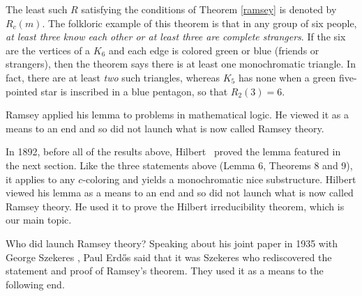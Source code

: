 \documentclass{article}
\theoremstyle{plain}
\theoremstyle{definition}
\newcommand{\Erdos}{Erd{\H{o}}s }
\begin{document}
The least such $R$ satisfying the conditions of Theorem \ref{ramsey} is denoted by $R_c(m)$.  The folkloric example of this theorem is 
that in any group of six people, \emph{at least three know each other or at least three are complete strangers}.  If the six are the vertices of a $K_6$ and each edge is 
colored green or blue (friends or strangers), then the theorem says there is at least one monochromatic triangle. In fact, there are at least \emph{two} such triangles, whereas $K_5$ has none when a green five-pointed star is inscribed in a blue pentagon, so that $R_2(3) = 6$.


Ramsey applied his lemma to problems in mathematical logic.  
He viewed it as a means to an end and
so did not launch what is now called Ramsey theory. 

In 1892, 
before all of the results above,  Hilbert~\cite{Hilbert1892} proved 
the lemma featured in the next section.
Like the three statements above (Lemma 6, Theorems 8 and 9), it applies to
any $c$-coloring and yields a monochromatic nice substructure.
Hilbert viewed his lemma as a means to an end and 
so did not launch what is now called Ramsey theory. He used it to prove the
Hilbert irreducibility theorem, which is
our main topic.

Who did launch Ramsey theory? 
%
Speaking about his joint paper in 1935 with George Szekeres \cite{ES}, Paul \Erdos said that it was Szekeres 
who rediscovered the statement and proof of Ramsey's theorem.  They used it as a means to the following end.
\end{document}
